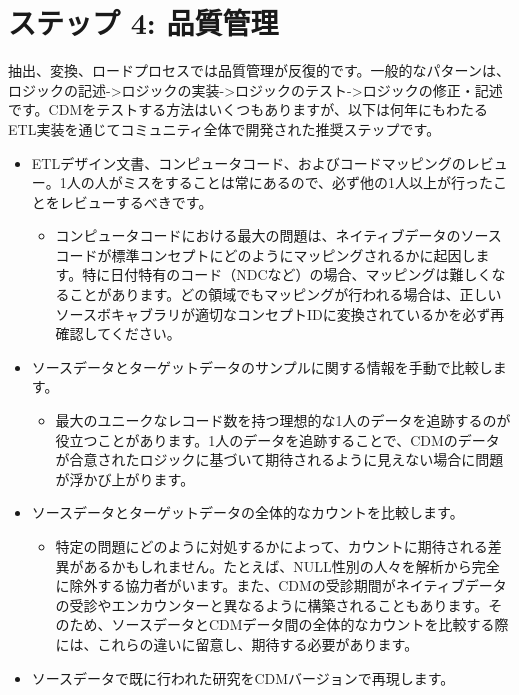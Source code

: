 \documentclass[
  11pt]{book}
\providecommand{\tightlist}{%
  \setlength{\itemsep}{0pt}\setlength{\parskip}{0pt}}
\theoremstyle{definition}
\theoremstyle{definition}
\theoremstyle{definition}
\theoremstyle{definition}
\theoremstyle{remark}
\begin{document}
\section{ステップ 4: 品質管理}\label{ux30b9ux30c6ux30c3ux30d7-4-ux54c1ux8ceaux7ba1ux7406}

抽出、変換、ロードプロセスでは品質管理が反復的です。一般的なパターンは、ロジックの記述-\textgreater ロジックの実装-\textgreater ロジックのテスト-\textgreater ロジックの修正・記述です。CDMをテストする方法はいくつもありますが、以下は何年にもわたるETL実装を通じてコミュニティ全体で開発された推奨ステップです。 

\begin{itemize}
\tightlist
\item
  ETLデザイン文書、コンピュータコード、およびコードマッピングのレビュー。1人の人がミスをすることは常にあるので、必ず他の1人以上が行ったことをレビューするべきです。

  \begin{itemize}
  \tightlist
  \item
    コンピュータコードにおける最大の問題は、ネイティブデータのソースコードが標準コンセプトにどのようにマッピングされるかに起因します。特に日付特有のコード（NDCなど）の場合、マッピングは難しくなることがあります。どの領域でもマッピングが行われる場合は、正しいソースボキャブラリが適切なコンセプトIDに変換されているかを必ず再確認してください。
  \end{itemize}
\item
  ソースデータとターゲットデータのサンプルに関する情報を手動で比較します。

  \begin{itemize}
  \tightlist
  \item
    最大のユニークなレコード数を持つ理想的な1人のデータを追跡するのが役立つことがあります。1人のデータを追跡することで、CDMのデータが合意されたロジックに基づいて期待されるように見えない場合に問題が浮かび上がります。
  \end{itemize}
\item
  ソースデータとターゲットデータの全体的なカウントを比較します。

  \begin{itemize}
  \tightlist
  \item
    特定の問題にどのように対処するかによって、カウントに期待される差異があるかもしれません。たとえば、NULL性別の人々を解析から完全に除外する協力者がいます。また、CDMの受診期間がネイティブデータの受診やエンカウンターと異なるように構築されることもあります。そのため、ソースデータとCDMデータ間の全体的なカウントを比較する際には、これらの違いに留意し、期待する必要があります。
  \end{itemize}
\item
  ソースデータで既に行われた研究をCDMバージョンで再現します。


\end{itemize}
\end{document}
